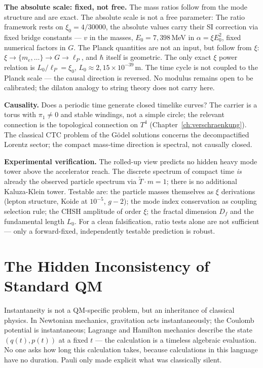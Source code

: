\textbf{The absolute scale: fixed, not free.} The mass ratios
follow from the mode structure and are exact. The absolute scale is
not a free parameter: The ratio framework rests on $\xi_0 = 4/30000$,
the absolute values carry their SI correction via fixed bridge constants
--- $v$ in the masses, $E_0 = 7{,}398$\,MeV in $\alpha = \xi E_0^2$,
fixed numerical factors in $G$. The Planck quantities are not an input,
but follow from $\xi$: $\xi\to\{m_e,\dots\}\to G\to\ell_P$, and
$\hbar$ itself is geometric. The only exact $\xi$ power relation
is $L_0/\ell_P = \xi_0$, $L_0\approx2{,}15\times10^{-39}$\,m. The
time cycle is not coupled to the Planck scale --- the causal direction
is reversed. No modulus remains open to be calibrated; the
dilaton analogy to string theory does not carry here.

\textbf{Causality.} Does a periodic time generate closed
timelike curves? The carrier is a torus with $\pi_1\neq0$ and stable
windings, not a simple circle; the relevant connection is the
topological connection on $T^4$ (Chapter~\ref{ch:verschraenkung}).
The classical CTC problem of the Gödel solutions concerns the
decompactified Lorentz sector; the compact mass-time direction is
spectral, not causally closed.

\textbf{Experimental verification.} The rolled-up view predicts no
hidden heavy mode tower above the accelerator reach. The discrete
spectrum of compact time \emph{is} already the observed particle spectrum via
$\tilde T\cdot m = 1$; there is no additional Kaluza-Klein tower.
Testable are: the particle masses themselves as $\xi$ derivations
(lepton structure, Koide at $10^{-5}$,
$g-2$); the mode index conservation as coupling selection rule; the
CHSH amplitude of order $\xi$; the fractal dimension $D_f$ and the
fundamental length $L_0$. For a clean falsification,
ratio tests alone are not sufficient --- only a forward-fixed,
independently testable prediction is robust.

\section{The Hidden Inconsistency of Standard QM}

Instantaneity is not a QM-specific problem, but an inheritance of
classical physics. In Newtonian mechanics, gravitation acts
instantaneously; the Coulomb potential is instantaneous; Lagrange and
Hamilton mechanics describe the state $(q(t),p(t))$ at a fixed
$t$ --- the calculation is a timeless algebraic evaluation. No one
asks how long this calculation takes, because calculations in this
language have no duration. Pauli only made explicit what was classically silent.

